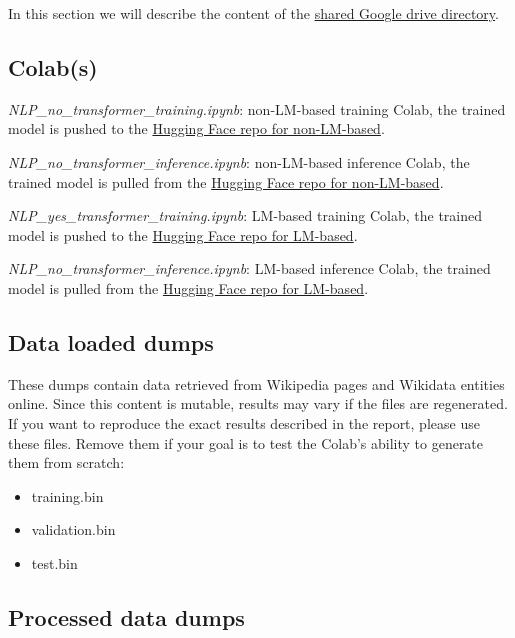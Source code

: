 \documentclass[11pt]{article}
\begin{document}
	In this section we will describe the content of the \href{https://drive.google.com/drive/folders/1t5pgHkdenMFPdKqQweiFl8vhIAaiVFTM?usp=drive_link}{shared Google drive directory}.
	
	\subsection{Colab(s)}
	
	\emph{NLP\_no\_transformer\_training.ipynb}: non-LM-based training Colab, the trained model is pushed to the
	\href{https://huggingface.co/fax4ever/culturalitems-no-transformer}{Hugging Face repo for non-LM-based}.
	
	\noindent \emph{NLP\_no\_transformer\_inference.ipynb}: non-LM-based inference Colab, the trained model is pulled from the
	\href{https://huggingface.co/fax4ever/culturalitems-no-transformer}{Hugging Face repo for non-LM-based}.
	
	\noindent \emph{NLP\_yes\_transformer\_training.ipynb}: LM-based training Colab, the trained model is pushed to the
	\href{https://huggingface.co/fax4ever/culturalitems-roberta-base}{Hugging Face repo for LM-based}.
	
	\noindent \emph{NLP\_no\_transformer\_inference.ipynb}: LM-based inference Colab, the trained model is pulled from the
	\href{https://huggingface.co/fax4ever/culturalitems-roberta-base}{Hugging Face repo for LM-based}.
	
	\subsection{Data loaded dumps}

	These dumps contain data retrieved from Wikipedia pages and Wikidata entities online. 
	Since this content is mutable, results may vary if the files are regenerated. 
	If you want to reproduce the exact results described in the report, please use these files. 
	Remove them if your goal is to test the Colab’s ability to generate them from scratch:
	
	 \begin{itemize}
	 	\item training.bin
	 	\item validation.bin
	 	\item test.bin
	 \end{itemize}
	 
	 \subsection{Processed data dumps}
	 
\end{document}
